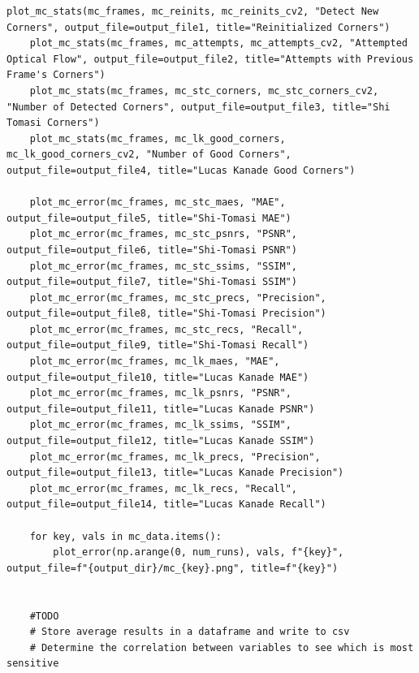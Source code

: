\documentclass[11pt, conference, letterpaper]{IEEEtran}
\begin{document}
\begin{lstlisting}[style=python, caption={\texttt{monte\_carlo\_analysis.py}}, label={lst:mc}]
    plot_mc_stats(mc_frames, mc_reinits, mc_reinits_cv2, "Detect New Corners", output_file=output_file1, title="Reinitialized Corners")
    plot_mc_stats(mc_frames, mc_attempts, mc_attempts_cv2, "Attempted Optical Flow", output_file=output_file2, title="Attempts with Previous Frame's Corners")
    plot_mc_stats(mc_frames, mc_stc_corners, mc_stc_corners_cv2, "Number of Detected Corners", output_file=output_file3, title="Shi Tomasi Corners")
    plot_mc_stats(mc_frames, mc_lk_good_corners, mc_lk_good_corners_cv2, "Number of Good Corners", output_file=output_file4, title="Lucas Kanade Good Corners")
    
    plot_mc_error(mc_frames, mc_stc_maes, "MAE", output_file=output_file5, title="Shi-Tomasi MAE")
    plot_mc_error(mc_frames, mc_stc_psnrs, "PSNR", output_file=output_file6, title="Shi-Tomasi PSNR")
    plot_mc_error(mc_frames, mc_stc_ssims, "SSIM", output_file=output_file7, title="Shi-Tomasi SSIM")
    plot_mc_error(mc_frames, mc_stc_precs, "Precision", output_file=output_file8, title="Shi-Tomasi Precision")
    plot_mc_error(mc_frames, mc_stc_recs, "Recall", output_file=output_file9, title="Shi-Tomasi Recall")
    plot_mc_error(mc_frames, mc_lk_maes, "MAE", output_file=output_file10, title="Lucas Kanade MAE")
    plot_mc_error(mc_frames, mc_lk_psnrs, "PSNR", output_file=output_file11, title="Lucas Kanade PSNR")
    plot_mc_error(mc_frames, mc_lk_ssims, "SSIM", output_file=output_file12, title="Lucas Kanade SSIM")
    plot_mc_error(mc_frames, mc_lk_precs, "Precision", output_file=output_file13, title="Lucas Kanade Precision")
    plot_mc_error(mc_frames, mc_lk_recs, "Recall", output_file=output_file14, title="Lucas Kanade Recall")
    
    for key, vals in mc_data.items():
        plot_error(np.arange(0, num_runs), vals, f"{key}", output_file=f"{output_dir}/mc_{key}.png", title=f"{key}")
        
        
    #TODO
    # Store average results in a dataframe and write to csv
    # Determine the correlation between variables to see which is most sensitive
\end{lstlisting}
\end{document}
